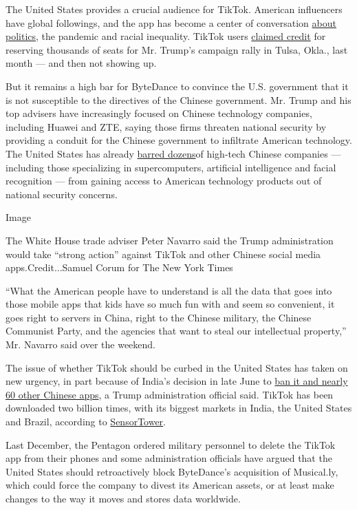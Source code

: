 The United States provides a crucial audience for TikTok. American
influencers have global followings, and the app has become a center of
conversation
\href{https://www.nytimes.com/2020/02/27/style/tiktok-politics-bernie-trump.html}{about
politics}, the pandemic and racial inequality. TikTok users
\href{https://www.nytimes.com/2020/06/21/style/tiktok-trump-rally-tulsa.html}{claimed
credit} for reserving thousands of seats for Mr. Trump's campaign rally
in Tulsa, Okla., last month --- and then not showing up.

But it remains a high bar for ByteDance to convince the U.S. government
that it is not susceptible to the directives of the Chinese government.
Mr. Trump and his top advisers have increasingly focused on Chinese
technology companies, including Huawei and ZTE, saying those firms
threaten national security by providing a conduit for the Chinese
government to infiltrate American technology. The United States has
already
\href{https://www.nytimes.com/2019/10/23/business/trump-technology-china-trade.html}{barred
dozens}of high-tech Chinese companies --- including those specializing
in supercomputers, artificial intelligence and facial recognition ---
from gaining access to American technology products out of national
security concerns.

Image

The White House trade adviser Peter Navarro said the Trump
administration would take ``strong action'' against TikTok and other
Chinese social media apps.Credit...Samuel Corum for The New York Times

``What the American people have to understand is all the data that goes
into those mobile apps that kids have so much fun with and seem so
convenient, it goes right to servers in China, right to the Chinese
military, the Chinese Communist Party, and the agencies that want to
steal our intellectual property,'' Mr. Navarro said over the weekend.

The issue of whether TikTok should be curbed in the United States has
taken on new urgency, in part because of India's decision in late June
to
\href{https://www.state.gov/secretary-michael-r-pompeo-with-laura-ingraham-of-fox-news-3/}{ban
it and nearly 60 other Chinese apps}, a Trump administration official
said. TikTok has been downloaded two billion times, with its biggest
markets in India, the United States and Brazil, according to
\href{https://sensortower.com/blog/tiktok-downloads-2-billion}{SensorTower}.

Last December, the Pentagon ordered military personnel to delete the
TikTok app from their phones and some administration officials have
argued that the United States should retroactively block ByteDance's
acquisition of Musical.ly, which could force the company to divest its
American assets, or at least make changes to the way it moves and stores
data worldwide.


